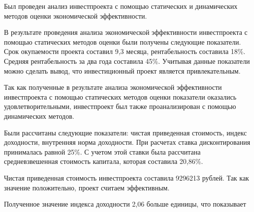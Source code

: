 Был проведен анализ инвестпроекта с помощью статических и динамических методов оценки экономической эффективности.

В результате проведения анализа экономической эффективности инвестпроекта с помощью статических методов оценки были получены следующие показатели. Срок окупаемости проекта составил 9,3 месяца, рентабельность составила 18\%. Средняя рентабельность за два года составила 45\%. Учитывая данные показатели можно сделать вывод, что инвестиционный проект является привлекательным.

Так как полученные в результате анализа экономической эффективности инвестпроекта с помощью статических методов оценки показатели оказались удовлетворительными, инвестпроект был также проанализирован с помощью динамических методов.

Были рассчитаны следующие показатели: чистая приведенная стоимость, индекс доходности, внутренняя норма доходности. При расчетах ставка дисконтирования принималась равной 25\%. С учетом этой ставки была рассчитана средневзвешенная стоимость капитала, которая составила 20,86\%.

Чистая приведенная стоимость инвестпроекта составила 9296213 рублей. Так как значение положительно, проект считаем эффективным.

Полученное значение индекса доходности 2,06 больше единицы, что показывает 




















